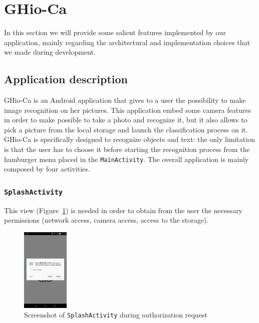 \section{GHio-Ca}
\label{sec:ghioca}
In this section we will provide some salient features implemented by our application, mainly regarding the architectural and implementation choices that we made during development.

\subsection{Application description}
GHio-Ca is an Android application that gives to a user the possibility to make image recognition on her pictures. This application embed some camera features in order to make possible to take a photo and recognize it, but it also allows to pick a picture from the local storage and launch the classification process on it.
GHio-Ca is specifically designed to recognize objects and text: the only limitation is that the user has to choose it before starting the recognition process from the hamburger menu placed in the \texttt{MainActivity}.
The overall application is mainly composed by four activities.

\subsubsection{\texttt{SplashActivity}}
This view (Figure~\ref{fig:splash}) is needed in order to obtain from the user the necessary permissions (network access, camera access, access to  the storage).
\begin{figure}[h]
    \centering
    \includegraphics[width=0.2\textwidth]{../img/splash}
    \caption{Screenshot of \texttt{SplashActivity} during authorization request}
    \label{fig:splash}
\end{figure}

